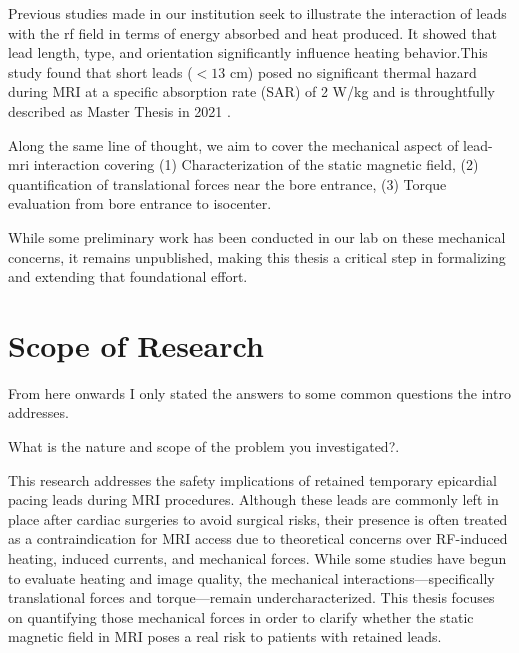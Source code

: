 
Previous studies made in our institution seek to illustrate the interaction of leads with the \gls{rf} field in terms of energy absorbed and heat produced. It showed that lead length, type, and orientation significantly influence heating behavior.This study found that short leads ($<13$ cm) posed no significant thermal hazard during MRI at a specific absorption rate (SAR) of 2 W/kg and is throughtfully described as Master Thesis in 2021 \cite{haddixProposal,astmF2182,aboyewa2021}.

Along the same line of thought, we aim to cover the mechanical aspect of lead-\gls{mri} interaction covering (1) Characterization of the static magnetic field, (2) quantification of translational forces near the bore entrance, (3) Torque evaluation from bore entrance to isocenter.

While some preliminary work has been conducted in our lab on these mechanical concerns, it remains unpublished, making this thesis a critical step in formalizing and extending that foundational effort.


\section{Scope of Research}

From here onwards I only stated the answers to some common questions the intro addresses.

What is the nature and scope of the problem you investigated?.

This research addresses the safety implications of retained temporary epicardial pacing leads during MRI procedures. Although these leads are commonly left in place after cardiac surgeries to avoid surgical risks, their presence is often treated as a contraindication for MRI access due to theoretical concerns over RF-induced heating, induced currents, and mechanical forces. While some studies have begun to evaluate heating and image quality, the mechanical interactions—specifically translational forces and torque—remain undercharacterized. This thesis focuses on quantifying those mechanical forces in order to clarify whether the static magnetic field in MRI poses a real risk to patients with retained leads.



